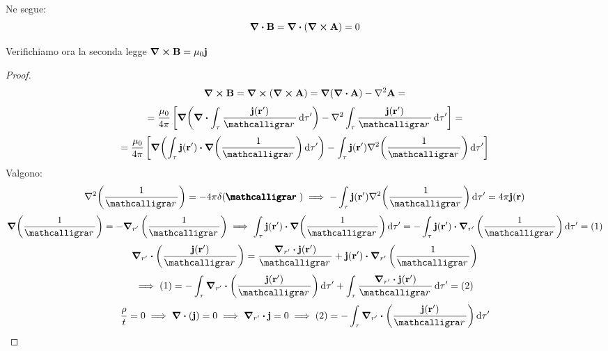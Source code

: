 \documentclass[12pt,a4paper]{article}
\begin{document}
Ne segue:
\begin{equation*}
    \div\vb{B}= \div(\curl{\vb{A}})= 0
\end{equation*}

Verifichiamo ora la seconda legge $\curl{\vb{B}}= \mu_0\vb{j}$
\begin{proof}
    \begin{equation*}
        \curl{\vb{B}}= \curl(\curl{\vb{A}})= \grad(\div \vb{A})-\laplacian{\vb{A}}=
    \end{equation*}
    \begin{equation*}
        =\frac{\mu_0}{4\pi}\left[ \grad(\div{\int_\tau\frac{\vb{j}(\vb{r'})}{\scriptr}\dd{\tau'}})
        -\laplacian{\int_\tau\frac{\vb{j}(\vb{r'})}{\scriptr}\dd{\tau'}} \right]=
    \end{equation*}
    \begin{equation*}
        =\frac{\mu_0}{4\pi}\left[ \grad(\int_\tau\vb{j}(\vb{r'})\vdot\grad( \frac{1}{\scriptr})\dd{\tau'})
        -\int_\tau\vb{j}(\vb{r'})\laplacian(\frac{1}{\scriptr})\dd{\tau'} \right]
    \end{equation*}
    Valgono:
    \begin{equation*}
        \laplacian(\frac{1}{\scriptr})= -4\pi\delta(\boldscriptr) \implies
        -\int_\tau\vb{j}(\vb{r'})\laplacian(\frac{1}{\scriptr})\dd{\tau'} = 4\pi\vb{j}(\vb{r})
    \end{equation*}
    \begin{equation*}
        \grad(\frac{1}{\scriptr}) = -\grad_{r'}\left( \frac{1}{\scriptr} \right)\implies \int_\tau\vb{j}(\vb{r'})\vdot\grad( \frac{1}{\scriptr})\dd{\tau'}
        = - \int_\tau\vb{j}(\vb{r'})\vdot\grad_{r'}\left( \frac{1}{\scriptr}\right)\dd{\tau'} = (1)
    \end{equation*}
    \begin{equation*}
        \grad_{r'}\vdot\left( \frac{\vb{j}(\vb{r}')}{\scriptr} \right)= \frac{\grad_{r'}\vdot\vb{j}(\vb{r}')}{\scriptr}+ \vb{j}(\vb{r}')\vdot\grad_{r'}\left( \frac{1}{\scriptr}\right)
    \end{equation*}
    \begin{equation*}
        \implies (1)= - \int_\tau\grad_{r'}\vdot\left( \frac{\vb{j}(\vb{r}')}{\scriptr} \right)\dd{\tau'}+ \int_\tau\frac{\grad_{r'}\vdot\vb{j}(\vb{r}')}{\scriptr}\dd{\tau'}= (2)
    \end{equation*}
    \begin{equation*}
        \frac{\rho}{t}= 0 \implies\div(\vb{j})= 0 \implies \grad_{r'}\vdot\vb{j}=0\implies
        (2)=- \int_\tau\grad_{r'}\vdot\left( \frac{\vb{j}(\vb{r}')}{\scriptr} \right)\dd{\tau'}

\end{equation*}
\end{proof}
\end{document}

